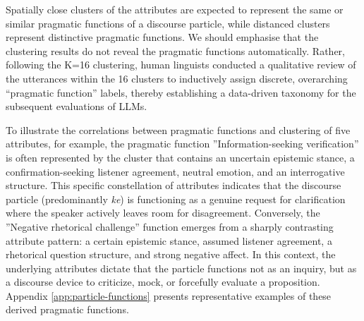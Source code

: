 \documentclass[11pt]{article}
\begin{document}

Spatially close clusters of the attributes are expected to represent the same or similar pragmatic functions of a discourse particle, while distanced clusters represent distinctive pragmatic functions. We should emphasise that the clustering results do not reveal the pragmatic functions automatically. Rather, following the K=16 clustering, human linguists conducted a qualitative review of the utterances within the 16 clusters to inductively assign discrete, overarching ``pragmatic function'' labels, thereby establishing a data-driven taxonomy for the subsequent evaluations of LLMs.



 To illustrate the correlations between pragmatic functions and clustering of five attributes, for example, the pragmatic function ''Information-seeking verification'' is often represented by the cluster that contains an uncertain epistemic stance, a confirmation-seeking listener agreement, neutral emotion, and an interrogative structure. This specific constellation of attributes indicates that the discourse particle (predominantly \textit{ke}) is functioning as a genuine request for clarification where the speaker actively leaves room for disagreement. Conversely, the ''Negative rhetorical challenge'' function emerges from a sharply contrasting attribute pattern: a certain epistemic stance, assumed listener agreement, a rhetorical question structure, and strong negative affect. In this context, the underlying attributes dictate that the particle functions not as an inquiry, but as a discourse device to criticize, mock, or forcefully evaluate a proposition. Appendix \ref{app:particle-functions} presents representative examples of these derived pragmatic functions.

\end{document}
